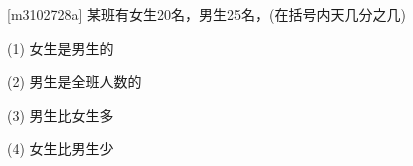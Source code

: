 [m3102728a]\quad
某班有女生20名，男生25名，(在括号内天几分之几) \par
(1) 女生是男生的 \par
(2) 男生是全班人数的 \par
(3) 男生比女生多 \par
(4) 女生比男生少
\par